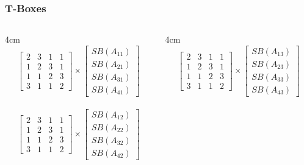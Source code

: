 \documentclass{beamer}
\begin{document}
\frame
{
	\frametitle{T-Boxes}

\begin{columns}
\begin{column}{4cm}
\begin{equation*}
\begin{bmatrix} 
2 & 3 & 1 & 1 \\
1 & 2 & 3 & 1 \\
1 & 1 & 2 & 3 \\
3 & 1 & 1 & 2 
\end{bmatrix}\times
\begin{bmatrix} 
SB(A_{11}) \\
SB(A_{21}) \\
SB(A_{31}) \\
SB(A_{41})  
\end{bmatrix}
\end{equation*}\\

\begin{equation*}
\begin{bmatrix} 
2 & 3 & 1 & 1 \\
1 & 2 & 3 & 1 \\
1 & 1 & 2 & 3 \\
3 & 1 & 1 & 2 
\end{bmatrix}\times
\begin{bmatrix} 
SB(A_{12}) \\
SB(A_{22}) \\
SB(A_{32}) \\
SB(A_{42})   
\end{bmatrix}
\end{equation*}



\end{column}
\begin{column}{4cm}	
\begin{equation*}
\begin{bmatrix} 
2 & 3 & 1 & 1 \\
1 & 2 & 3 & 1 \\
1 & 1 & 2 & 3 \\
3 & 1 & 1 & 2 
\end{bmatrix}\times
\begin{bmatrix} 
SB(A_{13})\\
SB(A_{23})\\
SB(A_{33})\\
SB(A_{43})  
\end{bmatrix}
\end{equation*}\\


\end{column}
\end{columns}}
\end{document}
